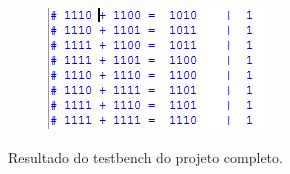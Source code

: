 \begin{figure}[H]
		\begin{subfigure}[b]{0.44\textwidth}
			\includegraphics[width=\textwidth]{img/etapa3/simulacaoSomadorCompleto4Bits_9}
			\label{fig:etapa3-9}
		\end{subfigure}

		\caption{Resultado do testbench do projeto completo.}
	\end{figure}

